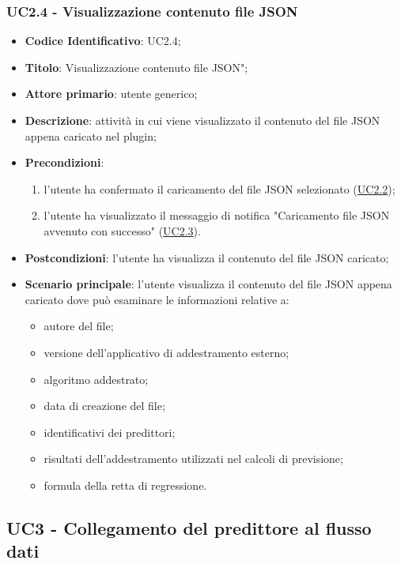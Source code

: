 		\label{par:UC2.4}
	\subsubsection{UC2.4 - Visualizzazione contenuto file JSON}
		\begin{itemize}
			\item\textbf{Codice Identificativo}: UC2.4;
			\item\textbf{Titolo}: Visualizzazione contenuto file JSON";
			\item\textbf{Attore primario}: utente generico;
			\item\textbf{Descrizione}: attività in cui viene visualizzato il contenuto del file JSON appena caricato nel plugin;
			\item\textbf{Precondizioni}: 
				\begin{enumerate}
					\item l'utente ha confermato il caricamento del file JSON selezionato (\hyperref[par:UC2.2]{UC2.2});
					\item l'utente ha visualizzato il messaggio di notifica "Caricamento file JSON avvenuto con successo" (\hyperref[par:UC2.3]{UC2.3}).
				\end{enumerate}
			\item\textbf{Postcondizioni}: l'utente ha visualizza il contenuto del file JSON caricato;
			\item\textbf{Scenario principale}: l'utente visualizza il contenuto del file JSON appena caricato dove può esaminare le informazioni relative a:
			\begin{itemize}
			\item autore del file;
			\item versione dell'applicativo di addestramento esterno;
			\item algoritmo addestrato;
			\item data di creazione del file;
			\item identificativi dei predittori;
			\item risultati dell'addestramento utilizzati nel calcoli di previsione;
			\item formula della retta di regressione.
\end{itemize}			
			
		\end{itemize}


	\label{par:UC3}
	\subsection{UC3 - Collegamento del predittore al flusso dati}

